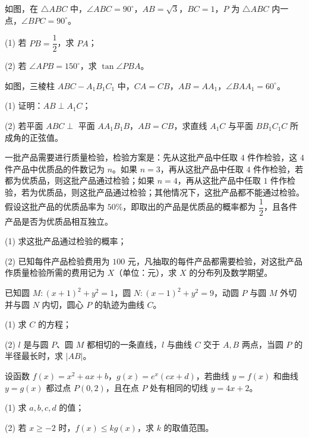 \Needspace{0.4\textheight}
\begin{question}
如图，在 $\triangle ABC$ 中，$\angle ABC=90^\circ$，$AB=\sqrt3$，$BC=1$，$P$ 为 $\triangle ABC$ 内一点，$\angle BPC=90^\circ$。
\nopagebreak[4]
\begin{center}\end{center}
\nopagebreak[4]
(1) 若 $PB=\dfrac12$，求 $PA$；

(2) 若 $\angle APB=150^\circ$，求 $\tan\angle PBA$。

\Needspace{0.4\textheight}
\end{question}
\begin{question}
如图，三棱柱 $ABC-A_1B_1C_1$ 中，$CA=CB$，$AB=AA_1$，$\angle BAA_1=60^\circ$。
\nopagebreak[4]
\begin{center}\end{center}
\nopagebreak[4]
(1) 证明：$AB\perp A_1C$；

(2) 若平面 $ABC\perp$ 平面 $AA_1B_1B$，$AB=CB$，求直线 $A_1C$ 与平面 $BB_1C_1C$ 所成角的正弦值。

\end{question}
\begin{question}
一批产品需要进行质量检验，检验方案是：先从这批产品中任取 $4$ 件作检验，这 $4$ 件产品中优质品的件数记为 $n$。如果 $n=3$，再从这批产品中任取 $4$ 件作检验，若都为优质品，则这批产品通过检验；如果 $n=4$，再从这批产品中任取 $1$ 件作检验，若为优质品，则这批产品通过检验；其他情况下，这批产品都不能通过检验。假设这批产品的优质品率为 $50\%$，即取出的产品是优质品的概率都为 $\dfrac12$，且各件产品是否为优质品相互独立。

(1) 求这批产品通过检验的概率；

(2) 已知每件产品检验费用为 $100$ 元，凡抽取的每件产品都需要检验，对这批产品作质量检验所需的费用记为 $X$（单位：元），求 $X$ 的分布列及数学期望。

\end{question}
\begin{question}
已知圆 $M:(x+1)^2+y^2=1$，圆 $N:(x-1)^2+y^2=9$，动圆 $P$ 与圆 $M$ 外切并与圆 $N$ 内切，圆心 $P$ 的轨迹为曲线 $C$。

(1) 求 $C$ 的方程；

(2) $l$ 是与圆 $P$、圆 $M$ 都相切的一条直线，$l$ 与曲线 $C$ 交于 $A,B$ 两点，当圆 $P$ 的半径最长时，求 $|AB|$。

\end{question}
\begin{question}
设函数 $f(x)=x^2+ax+b$，$g(x)=e^x(cx+d)$，若曲线 $y=f(x)$ 和曲线 $y=g(x)$ 都过点 $P(0,2)$，且在点 $P$ 处有相同的切线 $y=4x+2$。

(1) 求 $a,b,c,d$ 的值；

(2) 若 $x\geqslant-2$ 时，$f(x)\leqslant kg(x)$，求 $k$ 的取值范围。

\Needspace{0.4\textheight}
\end{question}
